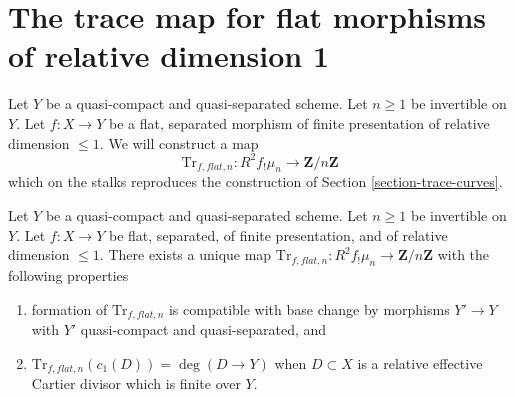 \section{The trace map for flat morphisms of relative dimension 1}
\label{section-construction-dim-1}

\noindent
Let $Y$ be a quasi-compact and quasi-separated scheme.
Let $n \geq 1$ be invertible on $Y$.
Let $f : X \to Y$ be a flat, separated morphism of finite presentation
of relative dimension $\leq 1$. We will construct a map
$$
\text{Tr}_{f, \mathit{flat}, n} :
R^2f_!\mu_n
\longrightarrow
\mathbf{Z}/n\mathbf{Z}
$$
which on the stalks reproduces the construction of
Section \ref{section-trace-curves}.

\begin{lemma}
\label{lemma-fixed-by-c1-relative}
Let $Y$ be a quasi-compact and quasi-separated scheme.
Let $n \geq 1$ be invertible on $Y$. Let $f : X \to Y$
be flat, separated, of finite presentation, and of
relative dimension $\leq 1$. There exists a unique map
$\text{Tr}_{f, \mathit{flat}, n} :
R^2f_!\mu_n
\to
\mathbf{Z}/n\mathbf{Z}$
with the following properties
\begin{enumerate}
\item formation of $\text{Tr}_{f, \mathit{flat}, n}$ is compatible with
base change by morphisms $Y' \to Y$ with $Y'$
quasi-compact and quasi-separated, and
\item $\text{Tr}_{f, \mathit{flat}, n}(c_1(D)) = \deg(D \to Y)$
when $D \subset X$ is a relative effective Cartier divisor
which is finite over $Y$.
\end{enumerate}
\end{lemma}

